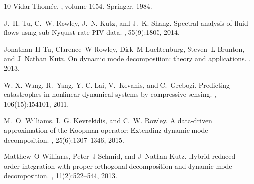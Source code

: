 \documentclass[10pt]{article}
\numberwithin{equation}{section}
\theoremstyle{plain}
\theoremstyle{remark}
\theoremstyle{remark}
\begin{document}
\begin{thebibliography}{10}
Vidar Thom{\'e}e.
, volume
  1054.
\newblock Springer, 1984.

J.~H. Tu, C.~W. Rowley, J.~N. Kutz, and J.~K. Shang.
\newblock Spectral analysis of fluid flows using sub-{N}yquist-rate {PIV} data.
, 55(9):1805, 2014.

Jonathan~H Tu, Clarence~W Rowley, Dirk~M Luchtenburg, Steven~L Brunton, and
  J~Nathan Kutz.
\newblock On dynamic mode decomposition: theory and applications.
, 2013.

W.-X. Wang, R.~Yang, Y.-C. Lai, V.~Kovanis, and C.~Grebogi.
\newblock Predicting catastrophes in nonlinear dynamical systems by compressive
  sensing.
, 106(15):154101, 2011.

M.~O. Williams, I.~G. Kevrekidis, and C.~W. Rowley.
\newblock A data-driven approximation of the {K}oopman operator: {E}xtending
  dynamic mode decomposition.
, 25(6):1307--1346, 2015.

Matthew~O Williams, Peter~J Schmid, and J~Nathan Kutz.
\newblock Hybrid reduced-order integration with proper orthogonal decomposition
  and dynamic mode decomposition.
, 11(2):522--544, 2013.

\end{thebibliography}
\end{document}
